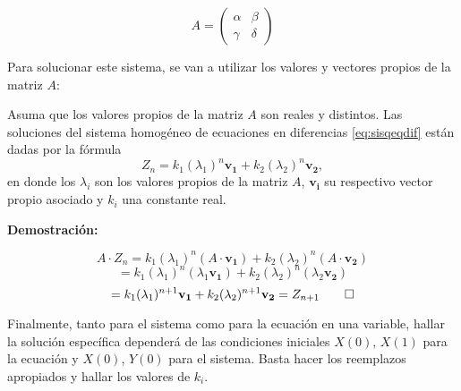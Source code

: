$$ A = \begin{pmatrix}
    \alpha & \beta\\
    \gamma  & \delta 
    \end{pmatrix} $$

Para solucionar este sistema, se van a utilizar los valores y vectores propios de la matriz $A$:

\begin{theorem}
    Asuma que los valores propios de la matriz $A$ son reales y distintos. Las soluciones del sistema homogéneo de ecuaciones en diferencias \ref{eq:sisqeqdif} están dadas por la fórmula
    $$Z_n = k_1 (\lambda_1)^n \mathbf{v_1}+k_2 (\lambda_2)^n \mathbf{v_2},$$
    en donde los $\lambda_i$ son los valores propios de la matriz $A$, $\mathbf{v_i}$ su respectivo vector propio asociado y $k_i$ una constante real.  
\end{theorem}

\textbf{Demostración:}

$$A\cdot Z_n = k_1(\lambda_1)^n(A\cdot \mathbf{v_1})+ k_2(\lambda_2)^n(A\cdot \mathbf{v_2})$$
$$=k_1(\lambda_1)^n(\lambda_1\mathbf{v_1})+ k_2(\lambda_2)^n(\lambda_2 \mathbf{v_2})$$
$$=k_1 (\lambda_1)^{n+1} \mathbf{v_1}+k_2 (\lambda_2)^{n+1} \mathbf{v_2}=Z_{n+1} \qed$$

Finalmente, tanto para el sistema como para la ecuación en una variable, hallar la solución específica dependerá de las condiciones iniciales $X(0)$, $X(1)$ para la ecuación y $X(0)$, $Y(0)$ para el sistema. Basta hacer los reemplazos apropiados y hallar los valores de $k_i$.
